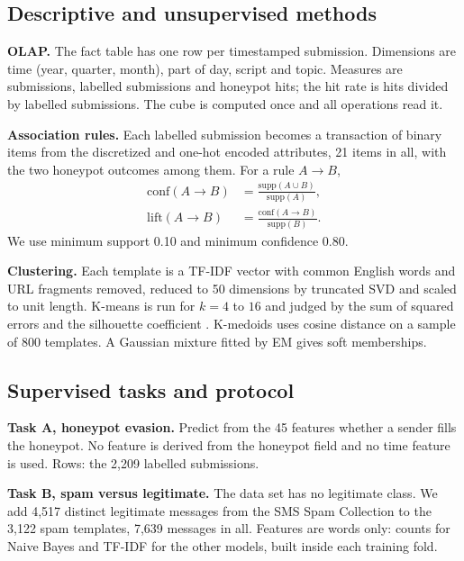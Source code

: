 \documentclass[conference]{IEEEtran}
\begin{document}
\subsection{Descriptive and unsupervised methods}

\textbf{OLAP.} The fact table has one row per timestamped submission. Dimensions are time (year, quarter,
month), part of day, script and topic. Measures are submissions, labelled submissions and honeypot hits; the
hit rate is hits divided by labelled submissions. The cube is computed once and all operations read it.

\textbf{Association rules.} Each labelled submission becomes a transaction of binary items from the
discretized and one-hot encoded attributes, 21 items in all, with the two honeypot outcomes among them. For a
rule $A \rightarrow B$,
\begin{align}
\mathrm{conf}(A \rightarrow B) &= \frac{\mathrm{supp}(A \cup B)}{\mathrm{supp}(A)}, \\
\mathrm{lift}(A \rightarrow B) &= \frac{\mathrm{conf}(A \rightarrow B)}{\mathrm{supp}(B)} .
\end{align}
We use minimum support 0.10 and minimum confidence 0.80.

\textbf{Clustering.} Each template is a TF-IDF vector \cite{salton1988} with common English words and URL
fragments removed, reduced to 50 dimensions by truncated SVD \cite{deerwester1990} and scaled to unit length.
K-means is run for $k = 4$ to $16$ and judged by the sum of squared errors and the silhouette coefficient
\cite{rousseeuw1987}. K-medoids uses cosine distance on a sample of 800 templates. A Gaussian mixture fitted by
EM gives soft memberships.

\subsection{Supervised tasks and protocol}

\textbf{Task A, honeypot evasion.} Predict from the 45 features whether a sender fills the honeypot. No feature
is derived from the honeypot field and no time feature is used. Rows: the 2,209 labelled submissions.

\textbf{Task B, spam versus legitimate.} The data set has no legitimate class. We add 4,517 distinct
legitimate messages from the SMS Spam Collection \cite{almeida2011} to the 3,122 spam templates, 7,639 messages
in all. Features are words only: counts for Naive Bayes and TF-IDF for the other models, built inside each
training fold.
\end{document}
